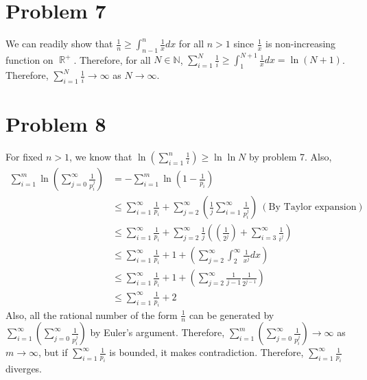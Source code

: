 \documentclass{article}
\DeclareMathOperator{\rr}{\mathbb{R}}
\begin{document}
\section*{Problem 7}
We can readily show that $\frac{1}{n}\geq \int_{n-1}^{n} \frac{1}{x} dx$ for all $n>1$ since $\frac{1}{x}$ is non-increasing function on $\rr^+$. Therefore, for all $N\in \mathbb{N}$, $\sum\limits_{i=1}^N \frac{1}{i}\geq \int_1^{N+1}\frac{1}{x} dx=\ln(N+1)$. Therefore, $\sum\limits_{i=1}^N \frac{1}{i}\rightarrow \infty$ as $N\rightarrow \infty$.

\section*{Problem 8}
For fixed $n>1$, we know that $\ln \left(\sum\limits_{i=1}^n \frac{1}{i}\right)\geq \ln \ln N$ by problem 7. Also,
\begin{equation*}
\begin{split}
\sum\limits_{i=1}^m \ln \left(\sum\limits_{j=0}^\infty \frac{1}{p_i^j}\right)&=-\sum\limits_{i=1}^m \ln \left(1-\frac{1}{p_i}\right) \\
&\leq \sum\limits_{i=1}^\infty \frac{1}{p_i} + \sum\limits_{j=2}^\infty \left(\frac{1}{j}\sum\limits_{i=1}^\infty \frac{1}{p^j_i}\right)~(\textrm{By Taylor expansion}) \\
&\leq \sum\limits_{i=1}^\infty \frac{1}{p_i} + \sum\limits_{j=2}^\infty \frac{1}{j}\left(\left(\frac{1}{2^j}\right)+\sum\limits_{i=3}^\infty \frac{1}{i^j}\right) \\
&\leq \sum\limits_{i=1}^\infty \frac{1}{p_i} + 1+\left(\sum\limits_{j=2}^\infty \int_2^\infty \frac{1}{x^j} dx \right) \\
&\leq \sum\limits_{i=1}^\infty \frac{1}{p_i} + 1+\left(\sum\limits_{j=2}^\infty \frac{1}{j-1}\frac{1}{2^{j-1}}\right) \\
&\leq \sum\limits_{i=1}^\infty \frac{1}{p_i} + 2
\end{split}
\end{equation*}
Also, all the rational number of the form $\frac{1}{n}$ can be generated by $\sum\limits_{i=1}^\infty\left(\sum\limits_{j=0}^\infty \frac{1}{p_i^j}\right)$ by Euler's argument. Therefore, $\sum\limits_{i=1}^m\left(\sum\limits_{j=0}^\infty \frac{1}{p_i^j}\right)\rightarrow \infty$ as $m\rightarrow \infty$, but if $\sum\limits_{i=1}^\infty \frac{1}{p_i}$ is bounded, it makes contradiction. Therefore, $\sum\limits_{i=1}^\infty \frac{1}{p_i}$ diverges.
\end{document}
